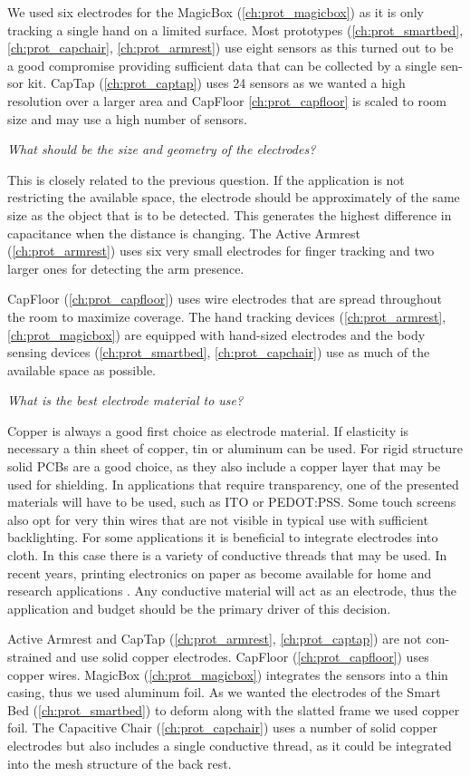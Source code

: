 We used six electrodes for the MagicBox (\ref{ch:prot_magicbox}) as it is only tracking a single hand on a limited surface. Most prototypes (\ref{ch:prot_smartbed}, \ref{ch:prot_capchair}, \ref{ch:prot_armrest}) use eight sensors as this turned out to be a good compromise providing sufficient data that can be collected by a single sen-sor kit. CapTap (\ref{ch:prot_captap}) uses 24 sensors as we wanted a high resolution over a larger area and CapFloor \ref{ch:prot_capfloor} is scaled to room size and may use a high number of sensors.

\textit{What should be the size and geometry of the electrodes?}

This is closely related to the previous question. If the application is not restricting the available space, the electrode should be approximately of the same size as the object that is to be detected. This generates the highest difference in capacitance when the distance is changing. The Active Armrest (\ref{ch:prot_armrest}) uses six very small electrodes for finger tracking and two larger ones for detecting the arm presence. 

CapFloor (\ref{ch:prot_capfloor}) uses wire electrodes that are spread throughout the room to maximize coverage. The hand tracking devices (\ref{ch:prot_armrest}, \ref{ch:prot_magicbox}) are equipped with hand-sized electrodes and the body sensing devices (\ref{ch:prot_smartbed}, \ref{ch:prot_capchair}) use as much of the available space as possible.

\textit{What is the best electrode material to use?}

Copper is always a good first choice as electrode material. If elasticity is necessary a thin sheet of copper, tin or aluminum can be used. For rigid structure solid PCBs are a good choice, as they also include a copper layer that may be used for shielding. In applications that require transparency, one of the presented materials will have to be used, such as ITO or PEDOT:PSS. Some touch screens also opt for very thin wires that are not visible in typical use with sufficient backlighting. For some applications it is beneficial to integrate electrodes into cloth. In this case there is a variety of conductive threads that may be used. In recent years, printing electronics on paper as become available for home and research applications \cite{kawahara2013instant}. Any conductive material will act as an electrode, thus the application and budget should be the primary driver of this decision. 

Active Armrest and CapTap (\ref{ch:prot_armrest}, \ref{ch:prot_captap}) are not con-strained and use solid copper electrodes. CapFloor (\ref{ch:prot_capfloor}) uses copper wires. MagicBox (\ref{ch:prot_magicbox}) integrates the sensors into a thin casing, thus we used aluminum foil. As we wanted the electrodes of the Smart Bed (\ref{ch:prot_smartbed}) to deform along with the slatted frame we used copper foil. The Capacitive Chair (\ref{ch:prot_capchair}) uses a number of solid copper electrodes but also includes a single conductive thread, as it could be integrated into the mesh structure of the back rest.

